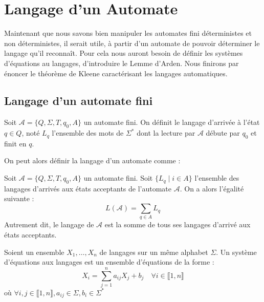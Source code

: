 \chapter{Langage d'un Automate}

\minitoc %

\setlength{\parindent}{0pt}
\renewcommand{\labelitemi}{\textbullet} %



Maintenant que nous savons bien manipuler les automates fini déterministes et non déterministes, il serait utile, 
à partir d'un automate de pouvoir déterminer le langage qu'il reconnaît. Pour cela nous auront besoin de définir 
les systèmes d'équations au langages, d'introduire le Lemme d'Arden. Nous finirons par énoncer le théorème de Kleene 
caractérisant les langages automatiques. 


\section{Langage d'un automate fini}

\begin{definition}
    Soit $ \mathcal{A} = \{Q, \Sigma, T, q_0, A\}$ un automate fini. On définit le langage d'arrivée à l'état $ q \in Q$, 
    noté $ L_q$ l'ensemble des mots de $ \Sigma^*$ dont la lecture par $ \mathcal{A}$ débute par $q_0$ et finit en $q$. 
\end{definition}

On peut alors définir la langage d'un automate comme :

\begin{proposition}
    Soit $ \mathcal{A} = \{Q, \Sigma, T, q_0, A\}$ un automate fini. Soit $\{L_q \; | \; i \in A \}$ 
    l'ensemble des langages d'arrivés aux états acceptants de l'automate $ \mathcal{A}$. On a alors l'égalité suivante : 
        \[ L( \mathcal{A}) = \sum_{q \in A} L_q \]
    Autrement dit, le langage de $ \mathcal{A}$ est la somme de tous ses langages d'arrivé aux états acceptants. 
\end{proposition}

\begin{definition}
    Soient un ensemble $X_1, \dots, X_n$ de langages sur un même alphabet $\Sigma$. 
    Un système d'équations aux langages est un ensemble d'équations de la forme : 
        \[ X_i = \sum_{j=1}^{n} a_{ij} X_j + b_j \quad \forall i \in \llbracket 1, n \rrbracket \] 
    où $ \forall i,j \in \llbracket 1, n \rrbracket, a_{ij} \in \Sigma, b_i \in \Sigma^*$
\end{definition}

